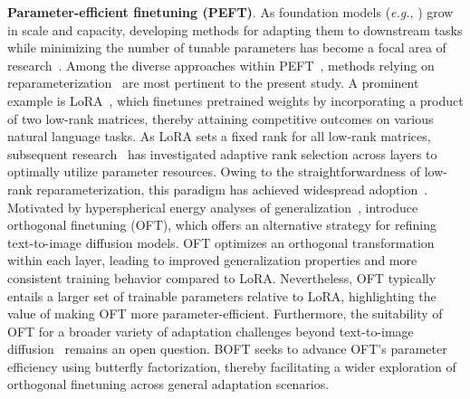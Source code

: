 \textbf{Parameter-efficient finetuning (PEFT)}. As foundation models (\emph{e.g.}, \cite{brown2020language,radford2021learning,rombach2022high,kirillov2023segment}) grow in scale and capacity, developing methods for adapting them to downstream tasks while minimizing the number of tunable parameters has become a focal area of research~\cite{treviso2023efficient,ding2023parameter,lialin2023scaling}. Among the diverse approaches within PEFT~\cite{houlsby2019parameter,aghajanyan2020intrinsic,hulora2022,edalati2022krona,wang2022adamix,gheini2021cross,zaken2022bitfit,guo2020parameter,sung2021training,ansell2022composable,lester2021power,li2021prefix,vu2022spot,he2021towards,mao2021unipelt,karimi2021compacter,liu2022few,sung2022lst,chen2022parameter,jia2022visual,chen2022adaptformer,zhang2022neural,jie2023fact,lian2022scaling,luo2023towards}, methods relying on reparameterization~\cite{aghajanyan2020intrinsic,hulora2022,edalati2022krona} are most pertinent to the present study. A prominent example is LoRA~\cite{hulora2022}, which finetunes pretrained weights by incorporating a product of two low-rank matrices, thereby attaining competitive outcomes on various natural language tasks. As LoRA sets a fixed rank for all low-rank matrices, subsequent research~\cite{zhang2022adaptive,valipour2022dylora,zhang2023increlora} has investigated adaptive rank selection across layers to optimally utilize parameter resources. Owing to the straightforwardness of low-rank reparameterization, this paradigm has achieved widespread adoption~\cite{dettmers2023qlora,zi2023delta,chavan2023one}. Motivated by hyperspherical energy analyses of generalization~\cite{liu2018learning,liu2021orthogonal}, \cite{qiu2023controlling} introduce orthogonal finetuning (OFT), which offers an alternative strategy for refining text-to-image diffusion models. OFT optimizes an orthogonal transformation within each layer, leading to improved generalization properties and more consistent training behavior compared to LoRA. Nevertheless, OFT typically entails a larger set of trainable parameters relative to LoRA, highlighting the value of making OFT more parameter-efficient. Furthermore, the suitability of OFT for a broader variety of adaptation challenges beyond text-to-image diffusion~\cite{qiu2023controlling} remains an open question. BOFT seeks to advance OFT's parameter efficiency using butterfly factorization, thereby facilitating a wider exploration of orthogonal finetuning across general adaptation scenarios.

